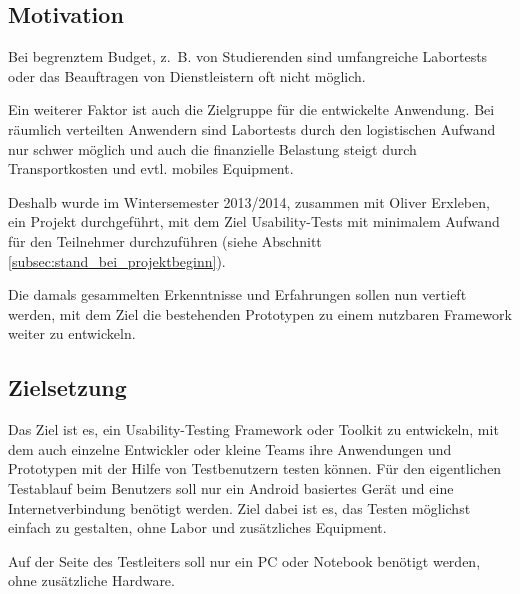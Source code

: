 \subsection{Motivation}
Bei begrenztem Budget, z.~B. von Studierenden sind umfangreiche Labortests oder das Beauftragen von Dienstleistern oft nicht möglich.

Ein weiterer Faktor ist auch die Zielgruppe für die entwickelte Anwendung.
Bei räumlich verteilten Anwendern sind Labortests durch den logistischen Aufwand nur schwer möglich und auch die finanzielle Belastung steigt durch Transportkosten und evtl. mobiles Equipment.

Deshalb wurde im Wintersemester 2013/2014, zusammen mit Oliver Erxleben, ein Projekt durchgeführt, mit dem Ziel Usability-Tests mit minimalem Aufwand für den Teilnehmer durchzuführen (siehe Abschnitt \ref{subsec:stand_bei_projektbeginn}).

Die damals gesammelten Erkenntnisse und Erfahrungen sollen nun vertieft werden, mit dem Ziel die bestehenden Prototypen zu einem nutzbaren Framework weiter zu entwickeln.


\subsection{Zielsetzung}
Das Ziel ist es, ein Usability-Testing Framework oder Toolkit zu entwickeln, mit dem auch einzelne Entwickler oder kleine Teams ihre Anwendungen und Prototypen mit der Hilfe von Testbenutzern testen können.
Für den eigentlichen Testablauf beim Benutzers soll nur ein Android basiertes Gerät und eine Internetverbindung benötigt werden.
Ziel dabei ist es, das Testen möglichst einfach zu gestalten, ohne Labor und zusätzliches Equipment.

Auf der Seite des Testleiters soll nur ein PC oder Notebook benötigt werden, ohne zusätzliche Hardware.
